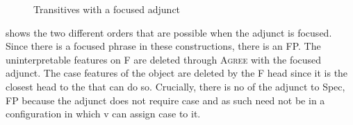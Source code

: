 \documentclass[output=paper,newtxmath,modfonts,nonflat,draft]{langsci/langscibook}
\begin{document}
  
\begin{figure}
%
\caption{\label{fig:selvanathan:7}Transitives with a focused adjunct}
\end{figure}


 shows the two different orders that are possible when the adjunct is focused. Since there is a focused phrase in these constructions, there is an FP. The uninterpretable  features on F are deleted through \textsc{Agree} with the focused adjunct. The case features of the object are deleted by the F head since it is the closest head to the  that can do so. Crucially, there is no  of the adjunct to Spec, FP because the adjunct does not require case and as such need not be in a configuration in which v can assign case to it. 
\end{document}

